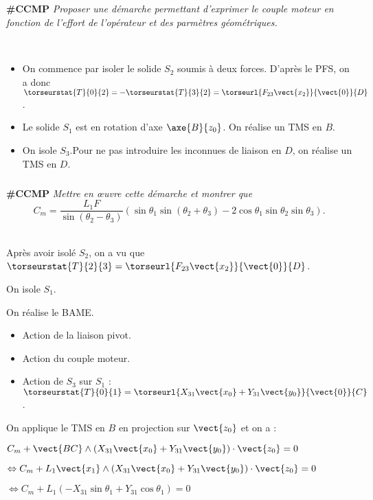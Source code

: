 \begin{multicols}{2}
\ifdifficile


\subparagraph{}\textbf{\#CCMP}
\textit{Proposer une démarche permettant d'exprimer le couple moteur en fonction de l'effort de l'opérateur et des parmètres géométriques.}
\ifprof
\begin{corrige}~\\
\begin{itemize}
\item On commence par isoler le solide $S_2$ soumis à deux forces. D'après le PFS, on a donc $\torseurstat{T}{0}{2}=-\torseurstat{T}{3}{2}=\torseurl{F_{23}\vect{x_2}}{\vect{0}}{D}$.
\item Le solide $S_1$ est en rotation d'axe $\axe{B}{z_0}$. On réalise un TMS en $B$.
\item On isole $S_3$.Pour ne pas introduire les inconnues de liaison en $D$, on réalise un TMS en $D$.
\end{itemize}
\end{corrige}
\else
\fi
\else
\fi


\ifdifficile
\subparagraph{}\textbf{\#CCMP}
\textit{Mettre en \oe{}uvre cette démarche et montrer que
$$C_m = \dfrac{L_1 F}{\sin \left(\theta_2 - \theta_3\right)}\left( \sin \theta_1 \sin\left( \theta_2+\theta_3 \right)  -2\cos \theta_1 \sin\theta_2\sin\theta_3\right).$$}
\ifprof
\begin{corrige}~\\
Après avoir isolé $S_2$, on a vu que $\torseurstat{T}{2}{3}=\torseurl{F_{23}\vect{x_2}}{\vect{0}}{D}$.


\vspace{.5cm} 

On isole $S_1$.

On réalise le BAME.
\begin{itemize}
\item Action de la liaison pivot. 
\item Action du couple moteur.
\item Action de $S_3$ sur $S_1$ : $\torseurstat{T}{0}{1}=\torseurl{X_{31}\vect{x_0}+Y_{31}\vect{y_0}}{\vect{0}}{C}$. 
\end{itemize}

On applique le TMS en $B$ en projection sur $\vect{z_0}$ et on a : 

$C_m + \vect{BC}\wedge\left(X_{31}\vect{x_0}+Y_{31}\vect{y_0} \right) \cdot\vect{z_0}=0$

$\Leftrightarrow C_m + L_1\vect{x_1}\wedge\left(X_{31}\vect{x_0}+Y_{31}\vect{y_0} \right) \cdot\vect{z_0}=0$

$\Leftrightarrow C_m + L_1\left(-X_{31}\sin \theta_1+Y_{31} \cos \theta_1 \right) =0$



\end{corrige}
\end{multicols}
